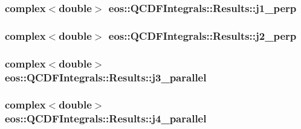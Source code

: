 \label{structeos_1_1QCDFIntegrals_1_1Results_a0f526f7579916a3a6d0ae2b8262a785c}
\hypertarget{structeos_1_1QCDFIntegrals_1_1Results_a17ec95c05f9109e6d5d2c7af30a2cc3c}{
\subsubsection[{j1\_\-perp}]{\setlength{\rightskip}{0pt plus 5cm}complex$<$double$>$ {\bf eos::QCDFIntegrals::Results::j1\_\-perp}}}
\label{structeos_1_1QCDFIntegrals_1_1Results_a17ec95c05f9109e6d5d2c7af30a2cc3c}
\hypertarget{structeos_1_1QCDFIntegrals_1_1Results_a75e99af294c74a56ecc0d22a6830ad51}{
\subsubsection[{j2\_\-perp}]{\setlength{\rightskip}{0pt plus 5cm}complex$<$double$>$ {\bf eos::QCDFIntegrals::Results::j2\_\-perp}}}
\label{structeos_1_1QCDFIntegrals_1_1Results_a75e99af294c74a56ecc0d22a6830ad51}
\hypertarget{structeos_1_1QCDFIntegrals_1_1Results_a5ba2925f4fa9f5425e4af1349aa1f7c4}{
\subsubsection[{j3\_\-parallel}]{\setlength{\rightskip}{0pt plus 5cm}complex$<$double$>$ {\bf eos::QCDFIntegrals::Results::j3\_\-parallel}}}
\label{structeos_1_1QCDFIntegrals_1_1Results_a5ba2925f4fa9f5425e4af1349aa1f7c4}
\hypertarget{structeos_1_1QCDFIntegrals_1_1Results_aba4329760d20d62cec5824c940026f98}{
\subsubsection[{j4\_\-parallel}]{\setlength{\rightskip}{0pt plus 5cm}complex$<$double$>$ {\bf eos::QCDFIntegrals::Results::j4\_\-parallel}}}
